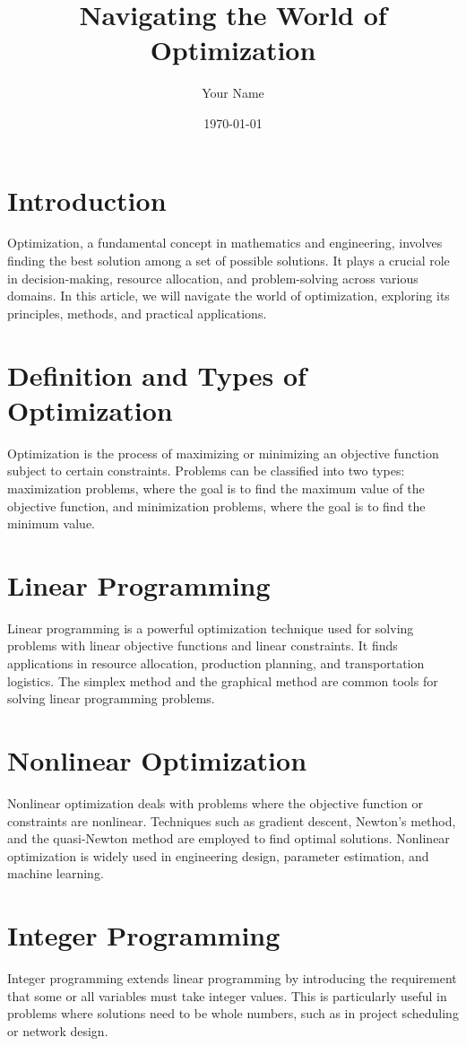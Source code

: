 \documentclass{article}
\title{Navigating the World of Optimization}
\author{Your Name}
\date{\today}
\begin{document}
\maketitle

\section*{Introduction}
Optimization, a fundamental concept in mathematics and engineering, involves finding the best solution among a set of possible solutions. It plays a crucial role in decision-making, resource allocation, and problem-solving across various domains. In this article, we will navigate the world of optimization, exploring its principles, methods, and practical applications.

\section*{Definition and Types of Optimization}
Optimization is the process of maximizing or minimizing an objective function subject to certain constraints. Problems can be classified into two types: maximization problems, where the goal is to find the maximum value of the objective function, and minimization problems, where the goal is to find the minimum value.

\section*{Linear Programming}
Linear programming is a powerful optimization technique used for solving problems with linear objective functions and linear constraints. It finds applications in resource allocation, production planning, and transportation logistics. The simplex method and the graphical method are common tools for solving linear programming problems.

\section*{Nonlinear Optimization}
Nonlinear optimization deals with problems where the objective function or constraints are nonlinear. Techniques such as gradient descent, Newton's method, and the quasi-Newton method are employed to find optimal solutions. Nonlinear optimization is widely used in engineering design, parameter estimation, and machine learning.

\section*{Integer Programming}
Integer programming extends linear programming by introducing the requirement that some or all variables must take integer values. This is particularly useful in problems where solutions need to be whole numbers, such as in project scheduling or network design.
\end{document}
